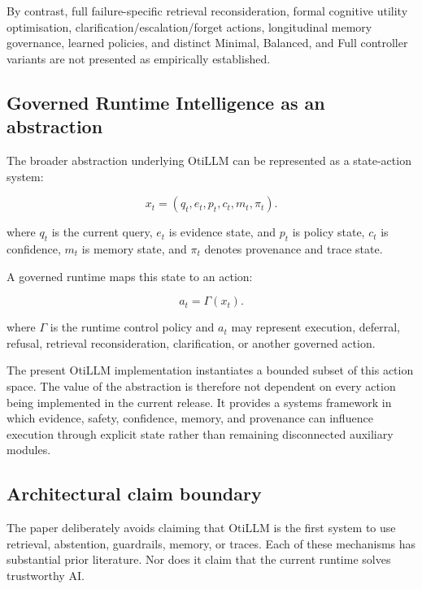 \documentclass[manuscript, screen, review]{jair}
\begin{document}
By contrast, full failure-specific retrieval reconsideration, formal cognitive
utility optimisation, clarification/escalation/forget actions, longitudinal
memory governance, learned policies, and distinct Minimal, Balanced, and Full
controller variants are not presented as empirically established.

\subsection{Governed Runtime Intelligence as an abstraction}

The broader abstraction underlying OtiLLM can be represented as a state-action
system:

\begin{equation}
x_t = (q_t, e_t, p_t, c_t, m_t, \pi_t).
\label{eq:runtime-state}
\end{equation}

where $q_t$ is the current query, $e_t$ is evidence state, and $p_t$ is
policy state, $c_t$ is confidence, $m_t$ is memory state, and $\pi_t$
denotes provenance and trace state.

A governed runtime maps this state to an action:

\begin{equation}
a_t = \Gamma(x_t).
\label{eq:runtime-action}
\end{equation}

where $\Gamma$ is the runtime control policy and $a_t$ may represent
execution, deferral, refusal, retrieval reconsideration, clarification, or
another governed action.

The present OtiLLM implementation instantiates a bounded subset of this action
space. The value of the abstraction is therefore not dependent on every action
being implemented in the current release. It provides a systems framework in
which evidence, safety, confidence, memory, and provenance can influence
execution through explicit state rather than remaining disconnected auxiliary
modules.

\subsection{Architectural claim boundary}

The paper deliberately avoids claiming that OtiLLM is the first system to use
retrieval, abstention, guardrails, memory, or traces. Each of these mechanisms
has substantial prior literature. Nor does it claim that the current runtime
solves trustworthy AI.
\end{document}
